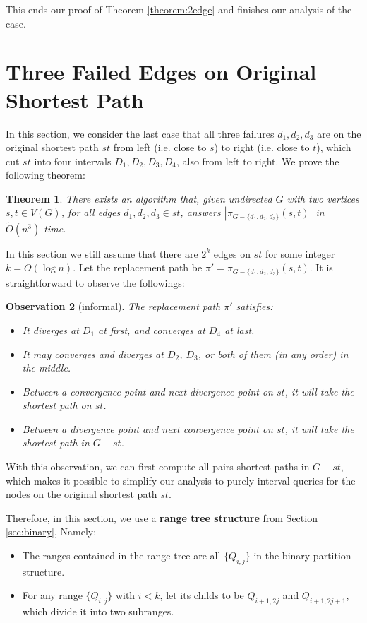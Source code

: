 \documentclass[11pt]{article}
\theoremstyle{plain}
\newtheorem{theorem}{Theorem}[section]
\newtheorem{observation}[theorem]{Observation}
\theoremstyle{definition}
\newcommand{\too}[1]{\tilde{O}({#1})}
\newcommand{\set}[1]{\{ #1 \}}
\newcommand{\og}[3]{\pi_{G-#3}\left(#1,#2\right)}
\begin{document}
This ends our proof of Theorem \ref{theorem:2edge} and finishes our analysis of the case.





 \section{Three Failed Edges on Original Shortest Path}\label{sec4}

In this section, we consider the last case that all three failures $d_1,d_2,d_3$ are on the original shortest path $st$ from left (i.e. close to $s$) to right (i.e. close to $t$), which cut $st$ into four intervals $D_1,D_2,D_3,D_4$, also from left to right. We prove the following theorem:

\begin{theorem}\label{thm:3edges}
There exists an algorithm that, given undirected $G$ with two vertices $s,t \in V(G)$, for all edges $d_1,d_2,d_3 \in st$, answers $|\og{s}{t}{\set{d_1, d_2, d_3}}|$ in $\too{n^3}$ time.
\end{theorem}

In this section we still assume that there are $2^k$ edges on $st$ for some integer $k=O(\log n)$. Let the replacement path be $\pi'=\pi_{G-\{d_1,d_2,d_3\}}(s,t)$. It is straightforward to observe the followings:

\begin{observation}[informal] The replacement path $\pi'$ satisfies:
\begin{itemize}
    \item It diverges at $D_1$ at first, and converges at $D_4$ at last.
    \item It may converges and diverges at $D_2$, $D_3$, or both of them (in any order) in the middle.
    \item Between a convergence point and next divergence point on $st$, it will take the shortest path on $st$.
    \item Between a divergence point and next convergence point on $st$, it will take the shortest path in $G-st$.
\label{obs:3failure}
\end{itemize}    
\end{observation}

With this observation, we can first compute all-pairs shortest paths in $G-st$, which makes it possible to simplify our analysis to purely interval queries for the nodes on the original shortest path $st$. 

Therefore, in this section, we use a \textbf {range tree structure} from Section \ref{sec:binary}, Namely: \begin{itemize}
    \item The ranges contained in the range tree are all $\{Q_{i,j}\}$ in the binary partition structure.
    \item For any range $\{Q_{i,j}\}$ with $i<k$, let its childs to be $Q_{i+1,2j}$ and $Q_{i+1,2j+1}$, which divide it into two subranges.
\end{itemize}
\end{document}
